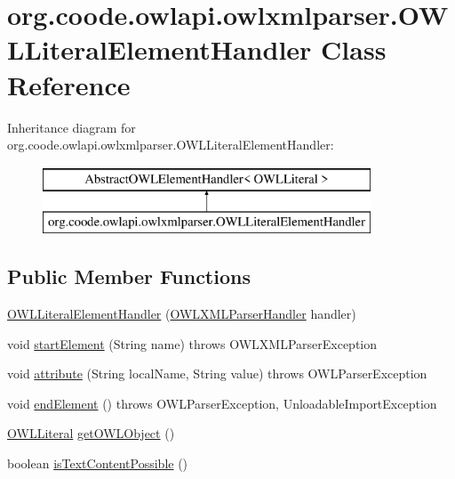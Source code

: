 \hypertarget{classorg_1_1coode_1_1owlapi_1_1owlxmlparser_1_1_o_w_l_literal_element_handler}{\section{org.\-coode.\-owlapi.\-owlxmlparser.\-O\-W\-L\-Literal\-Element\-Handler Class Reference}
\label{classorg_1_1coode_1_1owlapi_1_1owlxmlparser_1_1_o_w_l_literal_element_handler}
}
Inheritance diagram for org.\-coode.\-owlapi.\-owlxmlparser.\-O\-W\-L\-Literal\-Element\-Handler\-:\begin{figure}[H]
\begin{center}
\leavevmode
\includegraphics[height=2.000000cm]{classorg_1_1coode_1_1owlapi_1_1owlxmlparser_1_1_o_w_l_literal_element_handler}
\end{center}
\end{figure}
\subsection*{Public Member Functions}
\begin{DoxyCompactItemize}
\item 
\hyperlink{classorg_1_1coode_1_1owlapi_1_1owlxmlparser_1_1_o_w_l_literal_element_handler_aa3f779acf422763e3ea2ed448abf5e9f}{O\-W\-L\-Literal\-Element\-Handler} (\hyperlink{classorg_1_1coode_1_1owlapi_1_1owlxmlparser_1_1_o_w_l_x_m_l_parser_handler}{O\-W\-L\-X\-M\-L\-Parser\-Handler} handler)
\item 
void \hyperlink{classorg_1_1coode_1_1owlapi_1_1owlxmlparser_1_1_o_w_l_literal_element_handler_a5bb3db2dd9092d404e36adf03ec4bca7}{start\-Element} (String name)  throws O\-W\-L\-X\-M\-L\-Parser\-Exception 
\item 
void \hyperlink{classorg_1_1coode_1_1owlapi_1_1owlxmlparser_1_1_o_w_l_literal_element_handler_a80cabd07831797f1bd8e2cdd3ee478df}{attribute} (String local\-Name, String value)  throws O\-W\-L\-Parser\-Exception 
\item 
void \hyperlink{classorg_1_1coode_1_1owlapi_1_1owlxmlparser_1_1_o_w_l_literal_element_handler_adf4e2b8c723eb64b1599201b9d0a4358}{end\-Element} ()  throws O\-W\-L\-Parser\-Exception, Unloadable\-Import\-Exception 
\item 
\hyperlink{interfaceorg_1_1semanticweb_1_1owlapi_1_1model_1_1_o_w_l_literal}{O\-W\-L\-Literal} \hyperlink{classorg_1_1coode_1_1owlapi_1_1owlxmlparser_1_1_o_w_l_literal_element_handler_abcaeab7f3a86b06f46c2a196f4280f57}{get\-O\-W\-L\-Object} ()
\item 
boolean \hyperlink{classorg_1_1coode_1_1owlapi_1_1owlxmlparser_1_1_o_w_l_literal_element_handler_aeae832c31a64e1e63741e92e2cd76f38}{is\-Text\-Content\-Possible} ()
\end{DoxyCompactItemize}

